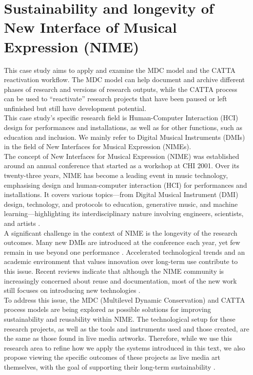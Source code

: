 \chapter{\label{ax:d-sustainability_and_longevity_of_nimes}Sustainability and longevity of New Interface of Musical Expression (NIME)}

This case study aims to apply and examine the MDC model and the CATTA reactivation workflow. The MDC model can help document and archive different phases of research and versions of research outputs, while the CATTA process can be used to “reactivate” research projects that have been paused or left unfinished but still have development potential.\\
This case study's specific research field is Human-Computer Interaction (HCI) design for performances and installations, as well as for other functions, such as education and inclusion. We mainly refer to Digital Musical Instruments (DMIs) in the field of New Interfaces for Musical Expression (NIMEs).\\
The concept of New Interfaces for Musical Expression (NIME) was established around an annual conference that started as a workshop at CHI 2001. Over its twenty-three years, NIME has become a leading event in music technology, emphasising design and human-computer interaction (HCI) for performances and installations. It covers various topics—from Digital Musical Instrument (DMI) design, technology, and protocols to education, generative music, and machine learning—highlighting its interdisciplinary nature involving engineers, scientists, and artists \cite{fasciani202120}.\\
A significant challenge in the context of NIME is the longevity of the research outcomes. Many new DMIs are introduced at the conference each year, yet few remain in use beyond one performance \cite{mamedes2014nime, morreale2017nime}. Accelerated technological trends \cite{devine2019decomposed, burkart2012cyberliberties} and an academic environment that values innovation over long-term use \cite{marquez2015fourteenyears, heyes2020nime} contribute to this issue. Recent reviews indicate that although the NIME community is increasingly concerned about reuse and documentation, most of the new work still focuses on introducing new technologies \cite{masu2023nime}.\\
To address this issue, the MDC (Multilevel Dynamic Conservation) and CATTA process models are being explored as possible solutions for improving sustainability and reusability within NIME. The technological setup for these research projects, as well as the tools and instruments used and those created, are the same as those found in live media artworks. Therefore, while we use this research area to refine how we apply the systems introduced in this text, we also propose viewing the specific outcomes of these projects as live media art themselves, with the goal of supporting their long-term sustainability \cite{fiordelmondo2024nime}.\\

